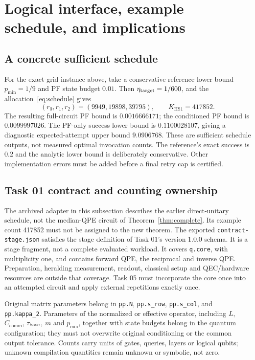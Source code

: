 \documentclass[11pt,a4paper]{article}
\newcommand{\C}{C_{\mathrm{comm}}}
\newcommand{\HS}{K_{\mathrm{HS1}}}
\begin{document}
\section{Logical interface, example schedule, and implications}
\subsection{A concrete sufficient schedule}
For the exact-grid instance above, take a conservative reference lower bound $p_{\min}=1/9$ and PF state budget $0.01$. Then $\eta_{\rm target}=1/600$, and the allocation~\eqref{eq:schedule} gives
\begin{equation}
 (r_0,r_1,r_2)=(9949,19898,39795),\qquad\HS=417852.
\end{equation}
The resulting full-circuit PF bound is $0.0016666171$; the conditioned PF bound is $0.0099997026$. The PF-only success lower bound is $0.1100028107$, giving a diagnostic expected-attempt upper bound $9.0906768$. These are sufficient schedule outputs, not measured optimal invocation counts. The reference's exact success is $0.2$ and the analytic lower bound is deliberately conservative. Other implementation errors must be added before a final retry cap is certified.

\subsection{Task 01 contract and counting ownership}
The archived adapter in this subsection describes the earlier direct-unitary schedule, not the median-QPE circuit of Theorem~\ref{thm:complete}. Its example count 417852 must not be assigned to the new theorem. The exported \texttt{contract-stage.json} satisfies the stage definition of Task 01's version 1.0.0 schema. It is a stage fragment, not a complete evaluated workload. It covers \texttt{q.core}, with multiplicity one, and contains forward QPE, the reciprocal and inverse QPE. Preparation, heralding measurement, readout, classical setup and QEC/hardware resources are outside that coverage. Task 05 must incorporate the core once into an attempted circuit and apply external repetitions exactly once.

Original matrix parameters belong in \texttt{pp.N}, \texttt{pp.s\_row}, \texttt{pp.s\_col}, and \texttt{pp.kappa\_2}. Parameters of the normalized or effective operator, including $L$, $\C$, $\tau_{\rm base}$, $m$ and $p_{\min}$, together with state budgets belong in the quantum configuration; they must not overwrite original conditioning or the common output tolerance. Counts carry units of gates, queries, layers or logical qubits; unknown compilation quantities remain unknown or symbolic, not zero.
\end{document}
